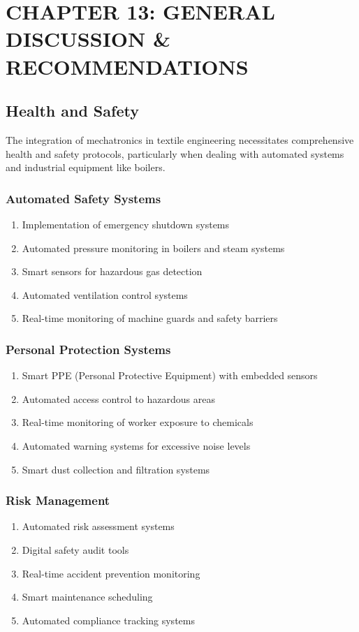 \section{CHAPTER 13: GENERAL DISCUSSION \& RECOMMENDATIONS}
\subsection{Health and Safety}
The integration of mechatronics in textile engineering necessitates comprehensive health and safety protocols, particularly when dealing with automated systems and industrial equipment like boilers.
\subsubsection{Automated Safety Systems}
\begin{enumerate}
\item Implementation of emergency shutdown systems
\item Automated pressure monitoring in boilers and steam systems
\item Smart sensors for hazardous gas detection
\item Automated ventilation control systems
\item Real-time monitoring of machine guards and safety barriers
\end{enumerate}
\subsubsection{Personal Protection Systems}
\begin{enumerate}
\item Smart PPE (Personal Protective Equipment) with embedded sensors
\item Automated access control to hazardous areas
\item Real-time monitoring of worker exposure to chemicals
\item Automated warning systems for excessive noise levels
\item Smart dust collection and filtration systems
\end{enumerate}
\subsubsection{Risk Management}
\begin{enumerate}
\item Automated risk assessment systems
\item Digital safety audit tools
\item Real-time accident prevention monitoring
\item Smart maintenance scheduling
\item Automated compliance tracking systems
\end{enumerate}
